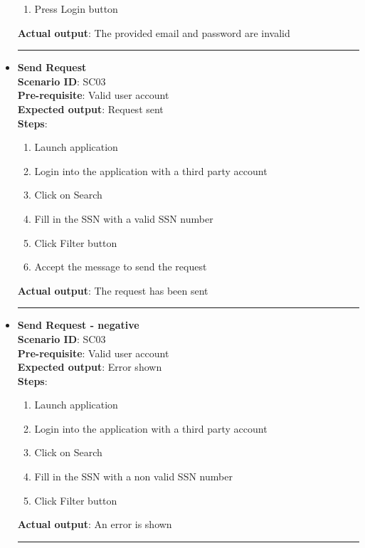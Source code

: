 \documentclass[a4paper, hidelinks, 12pt]{report}
\begin{document}
\begin{itemize}
\begin{enumerate}
			\item{Press Login button}
		\end{enumerate}
		\textbf{Actual output}: The provided email and password are invalid \\
		\rule{\linewidth}{0.4pt}
		\item{\textbf{Send Request}} \\
		\textbf{Scenario ID}: SC03 \\
		\textbf{Pre-requisite}: Valid user account \\
		\textbf{Expected output}: Request sent\\
		\textbf{Steps}:
		\begin{enumerate}
			\item{Launch application}
			\item{Login into the application with a third party account}
			\item{Click on Search}
			\item{Fill in the SSN with a valid SSN number}
			\item{Click Filter button}
			\item{Accept the message to send the request}
		\end{enumerate}
		\textbf{Actual output}: The request has been sent\\
		\rule{\linewidth}{0.4pt}

		\item{\textbf{Send Request - negative}} \\
		\textbf{Scenario ID}: SC03 \\
		\textbf{Pre-requisite}: Valid user account \\
		\textbf{Expected output}: Error shown\\
		\textbf{Steps}:
		\begin{enumerate}
			\item{Launch application}
			\item{Login into the application with a third party account}
			\item{Click on Search}
			\item{Fill in the SSN with a non valid SSN number}
			\item{Click Filter button}
		\end{enumerate}
		\textbf{Actual output}: An error is shown\\
		\rule{\linewidth}{0.4pt}


\end{itemize}
\end{document}
